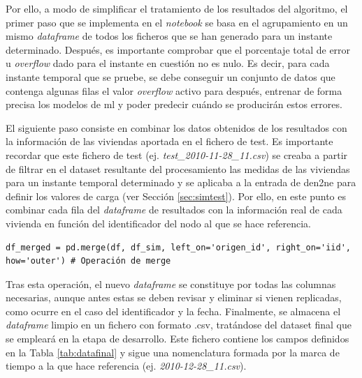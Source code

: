 \vspace{3mm}

Por ello, a modo de simplificar el tratamiento de los resultados del algoritmo, el primer paso que se implementa en el \textit{notebook} se basa en el agrupamiento en un mismo \textit{dataframe} de todos los ficheros que se han generado para un instante determinado. Después, es importante comprobar que el porcentaje total de error u \textit{overflow} dado para el instante en cuestión no es nulo. Es decir, para cada instante temporal que se pruebe, se debe conseguir un conjunto de datos que contenga algunas filas el valor \textit{overflow} activo para después, entrenar de forma precisa los modelos de \gls{ml} y poder predecir cuándo se producirán estos errores.

\vspace{3mm}

El siguiente paso consiste en combinar los datos obtenidos de los resultados con la información de las viviendas aportada en el fichero de test. Es importante recordar que este fichero de test (ej. \textit{test\_2010-11-28\_11.csv}) se creaba a partir de filtrar en el dataset resultante del procesamiento las medidas de las viviendas para un instante temporal determinado y se aplicaba a la entrada de \gls{den2ne} para definir los valores de carga (ver Sección \ref{sec:simtest}). Por ello, en este punto es combinar cada fila del \textit{dataframe} de resultados con la información real de cada vivienda en función del identificador del nodo al que se hace referencia. 

\vspace{3mm}

\begin{lstlisting}[style=Python, caption={Combinación de resultados y test}]
df_merged = pd.merge(df, df_sim, left_on='origen_id', right_on='iid', how='outer') # Operación de merge
\end{lstlisting}

\vspace{3mm}

Tras esta operación, el nuevo \textit{dataframe} se constituye por todas las columnas necesarias, aunque antes estas se deben revisar y eliminar si vienen replicadas, como ocurre en el caso del identificador y la fecha. 
Finalmente, se almacena el \textit{dataframe} limpio en un fichero con formato .csv, tratándose del dataset final que se empleará en la etapa de desarrollo. Este fichero contiene los campos definidos en la Tabla \ref{tab:datafinal} y sigue una nomenclatura formada por la marca de tiempo a la que hace referencia (ej. \textit{2010-12-28\_11.csv}). %

